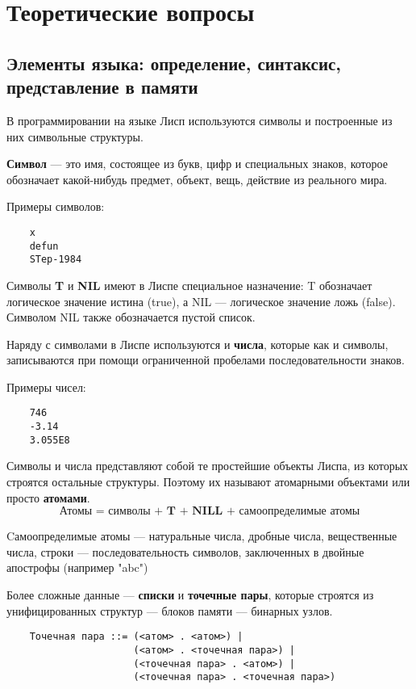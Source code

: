\chapter{Теоретические вопросы}

\section{Элементы языка: определение, синтаксис, представление в памяти}

В программировании на языке Лисп используются символы и построенные из них символьные структуры. 

\textbf{Символ} --- это имя, состоящее из букв, цифр и специальных знаков, которое обозначает какой-нибудь предмет, объект, вещь, действие из реального мира. 

Примеры символов:
\begin{lstlisting}
    x
    defun
    STep-1984
\end{lstlisting}

Символы \textbf{T} и \textbf{NIL} имеют в Лиспе специальное назначение: T обозначает логическое значение истина (true), а NIL --- логическое значение ложь (false). Символом NIL также обозначается пустой список. 

Наряду с символами в Лиспе используются и \textbf{числа}, которые как и символы, записываются при помощи ограниченной пробелами последовательности знаков. 

Примеры чисел:
\begin{lstlisting}
    746
    -3.14
    3.055E8
\end{lstlisting}

Символы и числа представляют собой те простейшие объекты Лиспа, из которых строятся остальные структуры. Поэтому их называют атомарными объектами или просто \textbf{атомами}. 
$$\textbf{Атомы = символы + T + NILL + самоопределимые атомы}$$

Cамоопределимые атомы --- натуральные числа, дробные числа, вещественные числа, строки --- последовательность
символов, заключенных в двойные апострофы (например "abc")

Более сложные данные --- \textbf{списки} и \textbf{точечные пары}, которые строятся из унифицированных структур --- блоков памяти --- бинарных узлов. 

\begin{lstlisting}
    Точечная пара ::= (<атом> . <атом>) | 
                      (<атом> . <точечная пара>) | 
                      (<точечная пара> . <атом>) | 
                      (<точечная пара> . <точечная пара>) 
\end{lstlisting}

